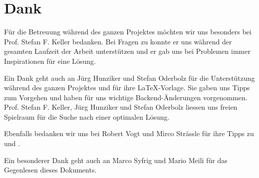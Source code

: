 \chapter*{Dank}
\thispagestyle{scrheadings}

Für die Betreuung während des ganzen Projektes möchten wir uns besonders bei Prof. Stefan F.
Keller bedanken.
Bei Fragen zu  konnte er uns während der gesamten Laufzeit der Arbeit unterstützen und er gab uns bei Problemen immer Inspirationen für eine Lösung. 

Ein Dank geht auch an Jürg Hunziker und Stefan Oderbolz für die Unterstützung während des ganzen Projektes und für ihre \LaTeX{}-Vorlage.
Sie gaben uns Tipps zum Vorgehen und haben für uns wichtige Backend-Änderungen vorgenommen. 
Prof. Stefan F. Keller, Jürg Hunziker und Stefan Oderbolz liessen uns freien Spielraum für die Suche nach einer optimalen Lösung.

Ebenfalls bedanken wir uns bei Robert Vogt und Mirco Strässle für ihre Tipps zu  und .

Ein besonderer Dank geht auch an Marco Syfrig und Mario Meili für das Gegenlesen dieses Dokuments.